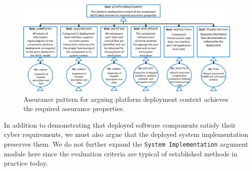 \begin{figure}[h] 
	\centering 
	\includegraphics[width=\textwidth]{figs/platform-deployment-context-achieves-assurance-properties.png}
	\caption{Assurance pattern for arguing platform deployment context achieves the required assurance properties.}
	\label{fig:platform-deployment-context-achieves-assurance-properties} 
\end{figure}
\vspace{-3mm}

In addition to demonstrating that deployed software components satisfy their cyber requirements, we must also argue that the deployed system implementation preserves them.  We do not further expand the \texttt{System Implementation} argument module here since the evaluation criteria are typical of established methods in practice today.
